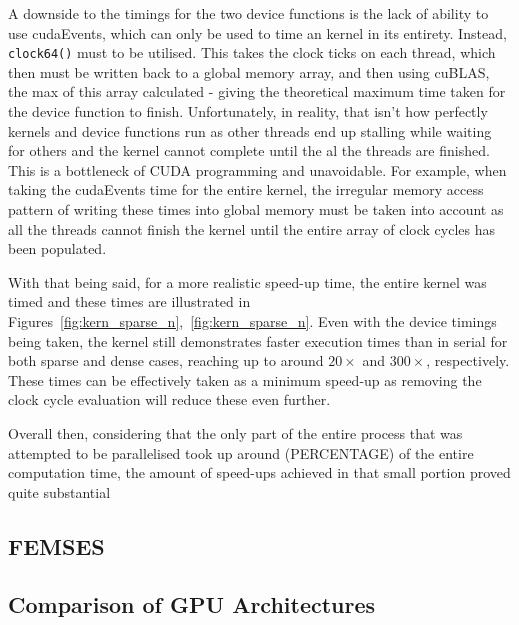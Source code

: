 A downside to the timings for the two device functions is the lack of ability to use cudaEvents, which can only be used to time an kernel in its entirety. Instead, \texttt{clock64()} must to be utilised. This takes the clock ticks on each thread, which then must be written back to a global memory array, and then using cuBLAS, the max of this array calculated - giving the theoretical maximum time taken for the device function to finish. Unfortunately, in reality, that isn't how perfectly kernels and device functions run as other threads end up stalling while waiting for others and the kernel cannot complete until the al the threads are finished. This is a bottleneck of CUDA programming and unavoidable. For example, when taking the cudaEvents time for the entire kernel, the irregular memory access pattern of writing these times into global memory must be taken into account as all the threads cannot finish the kernel until the entire array of clock cycles has been populated.

With that being said, for a more realistic speed-up time, the entire kernel was timed and these times are illustrated in Figures~\ref{fig:kern_sparse_n},~\ref{fig:kern_sparse_n}. Even with the device timings being taken, the kernel still demonstrates faster execution times than in serial for both sparse and dense cases, reaching up to around $20\times$ and $300\times$, respectively. These times can be effectively taken as a minimum speed-up as removing the clock cycle evaluation will reduce these even further.

Overall then, considering that the only part of the entire process that was attempted to be parallelised took up around (PERCENTAGE) of the entire computation time, the amount of speed-ups achieved in that small portion proved quite substantial

\subsection{FEMSES}

\subsection{Comparison of GPU Architectures}